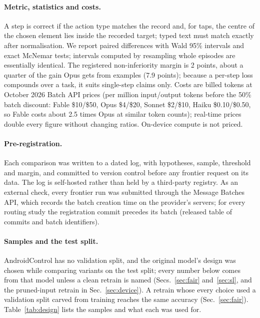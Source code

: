 \documentclass[10pt]{article}
\begin{document}
\paragraph{Metric, statistics and costs.} A step is correct if the action type matches the record and, for taps, the centre of the chosen element lies inside the recorded target; typed text must match exactly after normalisation. We report paired differences with Wald 95\% intervals and exact McNemar tests; intervals computed by resampling whole episodes are essentially identical. The registered non-inferiority margin is 2 points, about a quarter of the gain Opus gets from examples (7.9 points); because a per-step loss compounds over a task, it suits single-step claims only. Costs are billed tokens at October 2026 Batch API prices (per million input/output tokens before the 50\% batch discount: Fable \$10/\$50, Opus \$4/\$20, Sonnet \$2/\$10, Haiku \$0.10/\$0.50, so Fable costs about 2.5 times Opus at similar token counts); real-time prices double every figure without changing ratios. On-device compute is not priced.

\paragraph{Pre-registration.} Each comparison was written to a dated log, with hypotheses, sample, threshold and margin, and committed to version control before any frontier request on its data. The log is self-hosted rather than held by a third-party registry. As an external check, every frontier run was submitted through the Message Batches API, which records the batch creation time on the provider's servers; for every routing study the registration commit precedes its batch (released table of commits and batch identifiers).

\paragraph{Samples and the test split.} AndroidControl has no validation split, and the original model's design was chosen while comparing variants on the test split; every number below comes from that model unless a clean retrain is named (Secs.~\ref{sec:fair} and~\ref{sec:sl}, and the pruned-input retrain in Sec.~\ref{sec:device}). A retrain whose every choice used a validation split carved from training reaches the same accuracy (Sec.~\ref{sec:fair}). Table~\ref{tab:design} lists the samples and what each was used for.
\end{document}
